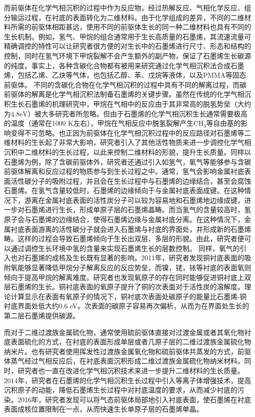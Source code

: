     而前驱体在化学气相沉积的过程中作为反应物，经过热解反应、气相化学反应、组分输运过程，在衬底的表面转化为二维材料。由于化学组成的差异，不同的二维材料所需的前驱体相距甚远，使用不同的前驱体生长的同一种二维材料也具有不同的生长机制。例如，氢气、甲烷的组合通常用于生长高质量的石墨烯，其流速流量可精确调控的特性可以让研究者很方便的对生长中的石墨烯进行尺寸、形态和结构的控制，同时在氢气环境下甲烷裂解不会产生额外的副产物，保证了石墨烯生长碳源的纯度。事实上，各种含碳化合物都有被用来研究通过化学气相沉积法合成石墨烯，包括乙烯、乙炔等气体，也包括乙醇、苯、戊烷等液体，以及PMMA等固态前驱体。%
    不同的含碳化合物在化学气相沉积的过程中具有不同的解离过程，而碳前驱体的解离是化学气相沉积法制备石墨烯的关键步骤。虽然在传统的化学气相沉积生长石墨烯的机理研究中，甲烷在气相中的反应由于其非常高的脱氢势垒（大约为$4.8\si{\electronvolt}$）被大多研究者所忽略。但由于石墨烯的化学气相沉积生长通常需要极高的温度（通常在1000 K左右），甲烷在气相反应中脱氢裂解产生CH$_3$等自由基的影响变得不可忽略。也正因为前驱体在化学气相沉积过程中的反应路径对石墨烯等二维材料的生长起了非常大影响，研究者引入了其他活性物质来进一步调控化学气相沉积中二维材料的生长过程，以此来控制二维材料的形貌，提升生长质量。同样以石墨烯为例，除了含碳前驱体外，研究者还通过引入如氢气，氧气等能够参与含碳前驱体解离和反应过程的物质参与到生长过程之中。通常，氢气会影响金属衬底表面活性碳分子的吸附过程，并且会在生长过程中与石墨烯的边缘结合，甚至会腐蚀石墨烯。在氢气含量较低时，石墨烯的边缘倾向于与金属衬底表面成键。在这种情况下，游离在金属衬底表面的活性炭分子可以较为容易地和石墨烯地边缘成键，进一步对石墨烯进行生长，形成单原子层的石墨烯晶畴。而当氢气的含量较高时，氢原子会与石墨烯的边缘结合，使得石墨烯边缘与金属衬底分离。在这种情况下，金属衬底表面游离的活性碳分子就会进入石墨烯与衬底的界面处，并形成新的石墨烯畴。这样的过程会导致石墨烯倾向于生长出双层、多层的形貌。由此，研究者便可以通过调控生长环境中氢的含量来实现石墨烯生长的层数控制。%
    同样，氧气的引入也对石墨烯的成核及生长既有显著的影响。2011年，研究者发现铜衬底表面的吸附氧能够显著降低甲烷分子解离反应的反应势垒，而镍，铑，铱等衬底的表面氧则倾向于提高甲烷的解离难度。研究者也发现氧原子的存在同时能够促进铜衬底上双层石墨烯的生长。铜衬底表面的氧原子提升了铜的次表面对于活性炭的溶解度。理论计算显示在表面有氧原子的情况下，铜衬底次表面处碳原子的能量比石墨烯-铜衬底界面处低大约0.6 eV。次表面的碳原子容易再次偏析，从而为在界面处生长的第二层石墨烯提供碳源。

    而对于二维过渡族金属硫化物，通常使用硫前驱体直接对过渡金属或者其氧化物衬底表面硫化的方式，在衬底的表面形成单层或者几原子层的二维过渡族金属硫化物纳米片。也有研究者使用挥发性过渡族金属氧化物和硫前驱体共蒸发的方式，前驱体蒸气经过气相反应后，在衬底表面沉积形成二维过渡族金属硫化物纳米材料。同时，研究者也一直在改进化学气相沉积技术来进一步提升二维材料的生长质量。2014年，研究者在石墨烯的化学气相沉积生长过程中引入等离子体增强技术，提高沉积原子的动能，降低石墨烯生长过程中对衬底温度的要求，从而减少衬底的污染。2016年，研究者发现可以将气态前驱体局部地引入衬底表面，使石墨烯在衬底表面成核位置限制在一点，从而快速生长单原子层的石墨烯单晶。

